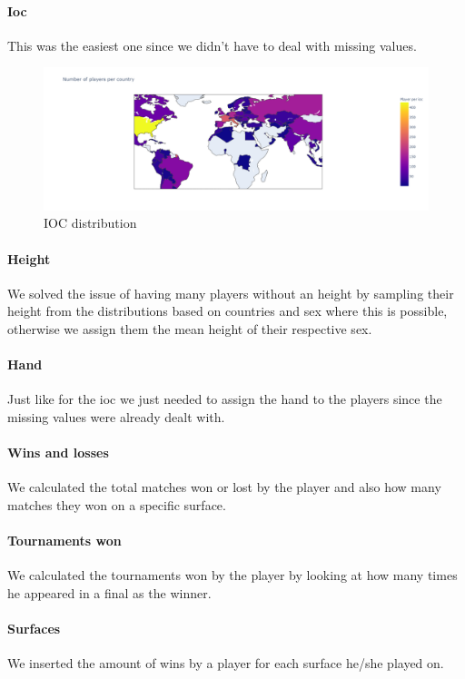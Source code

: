 \paragraph{Ioc} This was the easiest one since we didn't have to deal with missing values.
\begin{figure}[H]
    \centering
    \includegraphics[width=0.74\linewidth]{images/data_preparation/ioc_distribution.png}
    \caption{IOC distribution}
    \label{fig:ioc_feature}
\end{figure}

\paragraph{Height} We solved the issue of having many players without an height by sampling their height from the distributions based on countries and sex where this is possible, otherwise we assign them the mean height of their respective sex.

\paragraph{Hand} Just like for the ioc we just needed to assign the hand to the players since the missing values were already dealt with.

\paragraph{Wins and losses} We calculated the total matches won or lost by the player and also how many matches they won on a specific surface.

\paragraph{Tournaments won} We calculated the tournaments won by the player by looking at how many times he appeared in a final as the winner.

\paragraph{Surfaces} We inserted the amount of wins by a player for each surface he/she played on.

